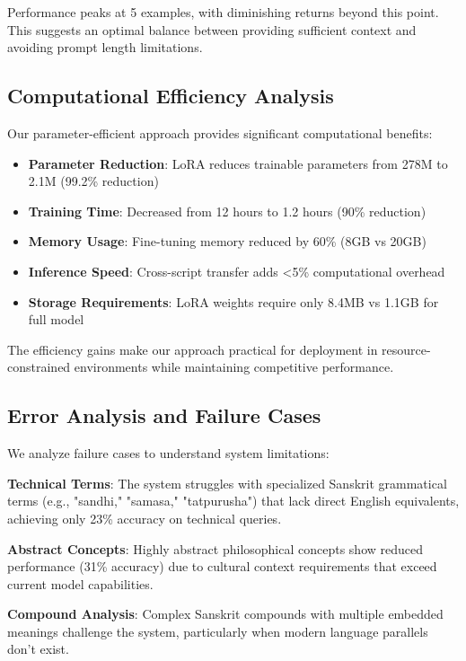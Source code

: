 \documentclass[runningheads]{llncs}
\begin{document}
\begin{table}
\begin{table}
Performance peaks at 5 examples, with diminishing returns beyond this point. This suggests an optimal balance between providing sufficient context and avoiding prompt length limitations.

\subsection{Computational Efficiency Analysis}

Our parameter-efficient approach provides significant computational benefits:

\begin{itemize}
\item \textbf{Parameter Reduction}: LoRA reduces trainable parameters from 278M to 2.1M (99.2\% reduction)
\item \textbf{Training Time}: Decreased from 12 hours to 1.2 hours (90\% reduction)
\item \textbf{Memory Usage}: Fine-tuning memory reduced by 60\% (8GB vs 20GB)
\item \textbf{Inference Speed}: Cross-script transfer adds <5\% computational overhead
\item \textbf{Storage Requirements}: LoRA weights require only 8.4MB vs 1.1GB for full model
\end{itemize}

The efficiency gains make our approach practical for deployment in resource-constrained environments while maintaining competitive performance.

\subsection{Error Analysis and Failure Cases}

We analyze failure cases to understand system limitations:

\textbf{Technical Terms}: The system struggles with specialized Sanskrit grammatical terms (e.g., "sandhi," "samasa," "tatpurusha") that lack direct English equivalents, achieving only 23\% accuracy on technical queries.

\textbf{Abstract Concepts}: Highly abstract philosophical concepts show reduced performance (31\% accuracy) due to cultural context requirements that exceed current model capabilities.

\textbf{Compound Analysis}: Complex Sanskrit compounds with multiple embedded meanings challenge the system, particularly when modern language parallels don't exist.


\end{table}
\end{table}
\end{document}
